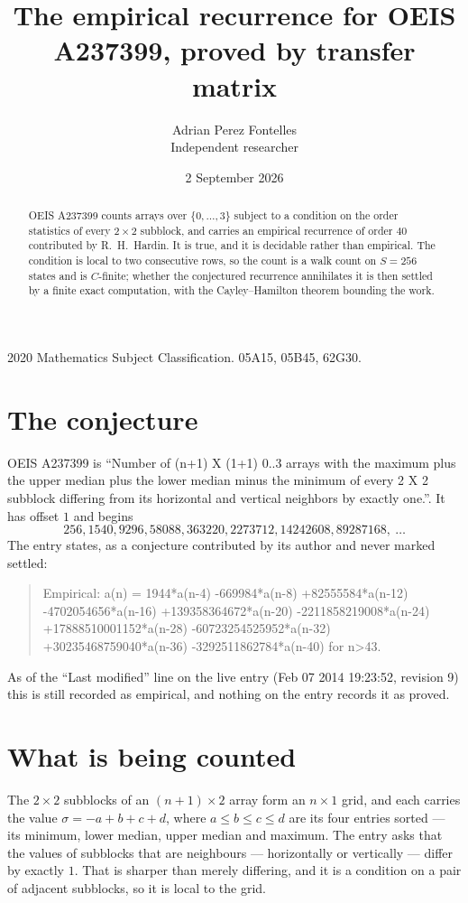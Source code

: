 \documentclass[11pt,a4paper]{article}
\title{The empirical recurrence for OEIS A237399, proved by transfer matrix}
\author{Adrian Perez Fontelles\\ \small Independent researcher}
\date{2 September 2026}
\theoremstyle{plain}
\theoremstyle{definition}
\begin{document}
\maketitle

\begin{abstract}
OEIS A237399 counts arrays over $\{0,\dots,3\}$ subject to a condition on the order
statistics of every $2\times2$ subblock, and carries an empirical recurrence of order
$40$ contributed by R.~H.~Hardin. It is true, and it is decidable rather than empirical.
The condition is local to two consecutive rows, so the count is a walk count on $S=256$
states and is $C$-finite; whether the conjectured recurrence annihilates it is then settled by
a finite exact computation, with the Cayley--Hamilton theorem bounding the work.
\end{abstract}

\noindent\small 2020 Mathematics Subject Classification. 05A15, 05B45, 62G30.\normalsize

\section{The conjecture}

OEIS A237399 is ``Number of (n+1) X (1+1) 0..3 arrays with the maximum plus the upper median plus the lower median minus the minimum of every 2 X 2 subblock differing from its horizontal and vertical neighbors by exactly one.''. It has offset $1$ and begins
\[
256, 1540, 9296, 58088, 363220, 2273712, 14242608, 89287168,\ \dots
\]
The entry states, as a conjecture contributed by its author and never marked settled:
\begin{quote}
Empirical: a(n) = 1944*a(n-4) -669984*a(n-8) +82555584*a(n-12) -4702054656*a(n-16) +139358364672*a(n-20) -2211858219008*a(n-24) +17888510001152*a(n-28) -60723254525952*a(n-32) +30235468759040*a(n-36) -3292511862784*a(n-40) for n>43.
\end{quote}
As of the ``Last modified'' line on the live entry (Feb 07 2014 19:23:52, revision 9) this is still
recorded as empirical, and nothing on the entry records it as proved.

\section{What is being counted}

The $2\times2$ subblocks of an $(n+1)\times2$ array form an
$n\times1$ grid, and each carries the value $\sigma=-a+b+c+d$, where $a\le b\le c\le d$ are its four entries sorted --- its minimum, lower median, upper median and maximum. The entry asks that the values of
subblocks that are neighbours --- horizontally or vertically --- differ by exactly $1$.
That is sharper than merely differing, and it is a condition on a pair of adjacent subblocks,
so it is local to the grid.
\end{document}
